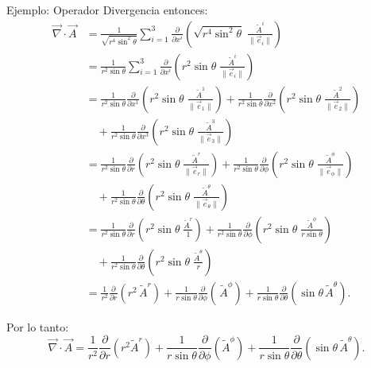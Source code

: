 \documentclass[../apunte_mecanica_clasica.tex]{subfiles}%
\begin{document}
\begin{apuntebloque}{Ejemplo: Operador Divergencia}
entonces:
\begin{align*}
    \vec{\nabla}\cdot \vec{A} 
    &= \frac{1}{\sqrt{r^4 \sin^2 \theta}} 
       \sum_{i=1}^3 \frac{\partial}{\partial x^i} 
       \left( \sqrt{r^4 \sin^2 \theta}\; 
              \frac{\tilde{A}^i}{\|\vec{e}_i\|} \right) \\[6pt]
    &= \frac{1}{r^2 \sin \theta} 
       \sum_{i=1}^3 \frac{\partial}{\partial x^i} 
       \left( r^2 \sin \theta \; \frac{\tilde{A}^i}{\|\vec{e}_i\|} \right)\\[6pt]
     &= \frac{1}{r^2 \sin \theta} 
        \frac{\partial}{\partial x^1} 
       \left( r^2 \sin \theta \; \frac{\tilde{A}^1}{\|\vec{e}_1\|} \right)+\frac{1}{r^2 \sin \theta} 
        \frac{\partial}{\partial x^2} 
       \left( r^2 \sin \theta \; \frac{\tilde{A}^2}{\|\vec{e}_2\|} \right)\\[6pt]
     &\quad + \frac{1}{r^2 \sin \theta} 
        \frac{\partial}{\partial x^3} 
       \left( r^2 \sin \theta \; \frac{\tilde{A}^3}{\|\vec{e}_3\|} \right)\\[8pt]  
     &= \frac{1}{r^2 \sin \theta} 
        \frac{\partial}{\partial r} 
       \left( r^2 \sin \theta \; \frac{\tilde{A}^r}{\|\vec{e}_r\|} \right)+\frac{1}{r^2 \sin \theta} 
        \frac{\partial}{\partial \phi} 
       \left( r^2 \sin \theta \; \frac{\tilde{A}^{\phi}}{\|\vec{e}_{\phi}\|} \right)\\[6pt]
     &\quad + \frac{1}{r^2 \sin \theta} 
        \frac{\partial}{\partial \theta} 
       \left( r^2 \sin \theta \; \frac{\tilde{A}^{\theta}}{\|\vec{e}_{\theta}\|} \right)\\[8pt]
         &= \frac{1}{r^2 \sin \theta} 
        \frac{\partial}{\partial r} 
       \left( r^2 \sin \theta \; \frac{\tilde{A}^r}{1} \right)+\frac{1}{r^2 \sin \theta} 
        \frac{\partial}{\partial \phi} 
       \left( r^2 \sin \theta \; \frac{\tilde{A}^{\phi}}{r \sin\theta} \right)\\[6pt]
     &\quad + \frac{1}{r^2 \sin \theta} 
        \frac{\partial}{\partial \theta} 
       \left( r^2 \sin \theta \; \frac{\tilde{A}^{\theta}}{r} \right)\\[8pt]  
    &= \frac{1}{r^2 } 
       \frac{\partial}{\partial r}\left(r^2\,\tilde{A}^r \right) 
     + \frac{1}{r \sin \theta} 
       \frac{\partial}{\partial \phi}\left(\,\tilde{A}^\phi \right)+ \frac{1}{r \sin \theta} 
       \frac{\partial}{\partial \theta}\left(\sin \theta \,\tilde{A}^\theta \right).
\end{align*}

Por lo tanto:
\begin{equation*}
    \vec{\nabla}\cdot \vec{A} 
    = \frac{1}{r^2}\frac{\partial}{\partial r}\!\left(r^2 \tilde{A}^r\right)
    + \frac{1}{r \sin \theta}\frac{\partial}{\partial \phi}\!\left(\tilde{A}^\phi\right)
    + \frac{1}{r \sin \theta}\frac{\partial}{\partial \theta}\!\left(\sin \theta\, \tilde{A}^\theta\right).
\end{equation*}

\end{apuntebloque}
\end{document}
